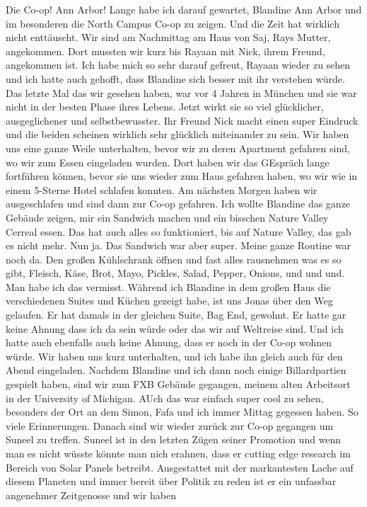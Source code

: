 \documentclass[11pt]{book}
\begin{document}
Die Co-op! Ann Arbor! Lange habe ich darauf gewartet, Blandine Ann Arbor und im besonderen die North Campus Co-op zu zeigen. Und die Zeit hat wirklich nicht 
enttäuscht. Wir sind am Nachmittag am Haus von Saj, Rays Mutter, angekommen. Dort mussten wir kurz bis Rayaan mit Nick, ihrem Freund, angekommen ist. Ich habe mich 
so sehr darauf gefreut, Rayaan wieder zu sehen und ich hatte auch gehofft, dass Blandine sich besser mit ihr verstehen würde. Das letzte Mal das wir gesehen haben, 
war vor 4 Jahren in München und sie war nicht in der besten Phase ihres Lebens. Jetzt wirkt sie so viel glücklicher, ausgeglichener und selbstbewusster. Ihr Freund Nick 
macht einen super Eindruck und die beiden scheinen wirklich sehr glücklich miteinander zu sein. Wir haben uns eine ganze Weile unterhalten, bevor wir zu deren 
Apartment gefahren sind, wo wir zum Essen eingeladen wurden. Dort haben wir das GEspräch lange fortführen können, bevor sie uns wieder zum Haus gefahren 
haben, wo wir wie in einem 5-Sterne Hotel schlafen konnten. 
Am nächsten Morgen haben wir ausgeschlafen und sind dann zur Co-op gefahren. Ich wollte Blandine das ganze Gebäude zeigen, mir ein Sandwich machen und ein bisschen 
Nature Valley Cerreal essen. Das hat auch alles so funktioniert, bis auf Nature Valley, das gab es nicht mehr. Nun ja. Das Sandwich war aber super. Meine ganze Routine 
war noch da. Den großen Kühlschrank öffnen und fast alles rausnehmen was es so gibt, Fleisch, Käse, Brot, Mayo, Pickles, Salad, Pepper, Onions, und und und. Man habe 
ich das vermisst. Während ich Blandine in dem großen Haus die verschiedenen Suites und Küchen gezeigt habe, ist uns Jonas über den Weg gelaufen. Er hat damals 
in der gleichen Suite, Bag End, gewohnt. Er hatte gar keine Ahnung dass ich da sein würde oder das wir auf Weltreise sind. Und ich hatte auch ebenfalls auch keine Ahnung, 
dass er noch in der Co-op wohnen würde. Wir haben uns kurz unterhalten, und ich habe ihn gleich auch für den Abend eingeladen. Nachdem Blandine und ich dann noch einige 
Billardpartien gespielt haben, sind wir zum FXB Gebäude gegangen, meinem alten Arbeitsort in der University of Michigan. AUch das war einfach super cool zu sehen, 
besonders der Ort an dem Simon, Fafa und ich immer Mittag gegessen haben. So viele Erinnerungen. Danach sind wir wieder zurück zur Co-op gegangen um Suneel zu treffen. 
Suneel ist in den letzten Zügen seiner Promotion und wenn man es nicht wüsste könnte man nich erahnen, dass er cutting edge research im Bereich von Solar Panels 
betreibt. Ausgestattet mit der markantesten Lache auf diesem Planeten und immer bereit über Politik zu reden ist er ein unfassbar angenehmer Zeitgenosse und wir haben 
\end{document}
